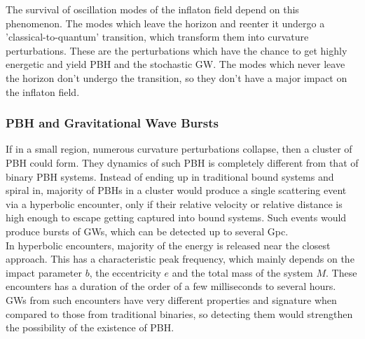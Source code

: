 The survival of oscillation modes of the inflaton field depend on this phenomenon. The modes which leave the horizon and reenter it undergo a 'classical-to-quantum' transition, which transform them into curvature perturbations. These are the perturbations which have the chance to get highly energetic and yield PBH and the stochastic GW. The modes which never leave the horizon don't undergo the transition, so they don't have a major impact on the inflaton field. \cite{CHE}

\subsubsection{PBH and Gravitational Wave Bursts}
If in a small region, numerous curvature perturbations collapse, then a cluster of PBH could form. They dynamics of such PBH is completely different from that of binary PBH systems. Instead of ending up in traditional bound systems and spiral in, majority of PBHs in a cluster would produce a single scattering event via a hyperbolic encounter, only if their relative velocity or relative distance is high enough to escape getting captured into bound systems. Such events would produce bursts of GWs, which can be detected up to several Gpc. \\

In hyperbolic encounters, majority of the energy is released near the closest approach. This has a characteristic peak frequency, which mainly depends on the impact parameter $b$, the eccentricity $e$ and the total mass of the system $M$. These encounters has a duration of the order of a few milliseconds to several hours.\\

GWs from such encounters have very different properties and signature when compared to those from traditional binaries, so detecting them would strengthen the possibility of the existence of PBH. \cite{Garc_a_Bellido_2017}
\pagebreak